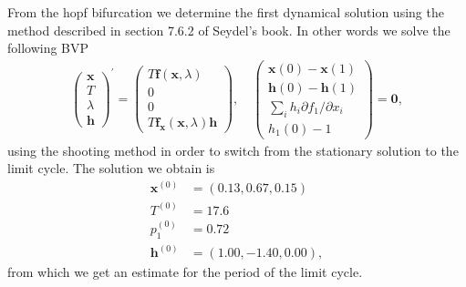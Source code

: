 From the hopf bifurcation we determine the first dynamical solution using the method described in 
section 7.6.2 of Seydel's book. In other words we solve the following BVP 
\begin{align*}
    \left(\begin{array}{l}
        \mathbf{x} \\
        T \\
        \lambda \\
        \mathbf{h}
        \end{array}\right)^{\prime}=\left(\begin{array}{c}
        T \mathbf{f}(\mathbf{x}, \lambda) \\
        0 \\
        0 \\
        T \mathbf{f}_{\mathbf{x}}(\mathbf{x}, \lambda) \mathbf{h}
        \end{array}\right), \quad\left(\begin{array}{c}
        \mathbf{x}(0)-\mathbf{x}(1) \\
        \mathbf{h}(0)-\mathbf{h}(1) \\
        \sum_i h_i \partial f_1 / \partial x_i \\
        h_1(0)-1
        \end{array}\right)=\mathbf{0},
\end{align*}
using the shooting method in order to switch from the stationary solution to the limit cycle. 
The solution we obtain is
\begin{align*}
    \mathbf{x}^{(0)} & = (0.13, 0.67, 0.15)\\
    T^{(0)} &= 17.6\\
    p_1^{(0)} & = 0.72 \\
    \mathbf{h}^{(0)} &= (1.00, -1.40 , 0.00),
\end{align*}
from which we get an estimate for the period of the limit cycle.

